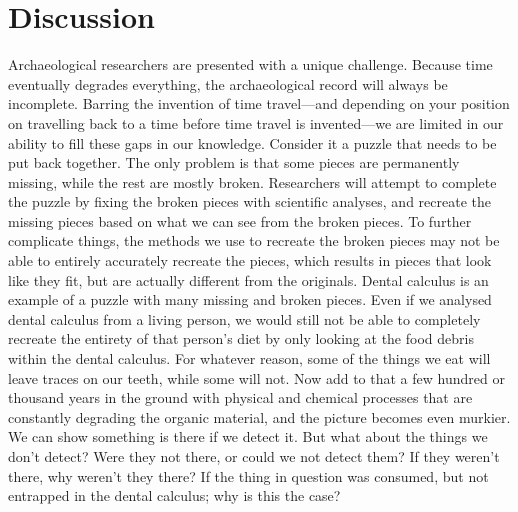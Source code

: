 \documentclass[
  b5paper,
]{book}
\begin{document}
\hypertarget{chap-discussion}{%
\chapter{Discussion}\label{chap-discussion}}

Archaeological researchers are presented with a unique challenge.
Because time eventually degrades everything, the archaeological record
will always be incomplete. Barring the invention of time travel---and
depending on your position on travelling back to a time before time
travel is invented---we are limited in our ability to fill these gaps in
our knowledge. Consider it a puzzle that needs to be put back together.
The only problem is that some pieces are permanently missing, while the
rest are mostly broken. Researchers will attempt to complete the puzzle
by fixing the broken pieces with scientific analyses, and recreate the
missing pieces based on what we can see from the broken pieces. To
further complicate things, the methods we use to recreate the broken
pieces may not be able to entirely accurately recreate the pieces, which
results in pieces that look like they fit, but are actually different
from the originals. Dental calculus is an example of a puzzle with many
missing and broken pieces. Even if we analysed dental calculus from a
living person, we would still not be able to completely recreate the
entirety of that person's diet by only looking at the food debris within
the dental calculus. For whatever reason, some of the things we eat will
leave traces on our teeth, while some will not. Now add to that a few
hundred or thousand years in the ground with physical and chemical
processes that are constantly degrading the organic material, and the
picture becomes even murkier. We can show something is there if we
detect it. But what about the things we don't detect? Were they not
there, or could we not detect them? If they weren't there, why weren't
they there? If the thing in question was consumed, but not entrapped in
the dental calculus; why is this the case?
\end{document}
